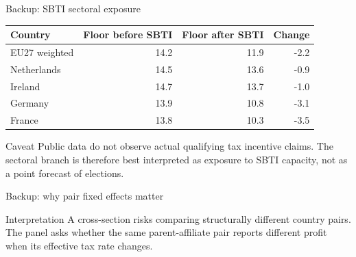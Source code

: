 \documentclass[aspectratio=169, 11pt]{beamer}
\begin{document}
\begin{frame}{Backup: SBTI sectoral exposure}
\begin{center}
\small
\begin{tabular}{@{}lrrr@{}}
  \toprule
  Country & Floor before SBTI & Floor after SBTI & Change \\
  \midrule
  EU27 weighted & 14.2 & 11.9 & -2.2 \\
  Netherlands & 14.5 & 13.6 & -0.9 \\
  Ireland & 14.7 & 13.7 & -1.0 \\
  Germany & 13.9 & 10.8 & -3.1 \\
  France & 13.8 & 10.3 & -3.5 \\
  \bottomrule
\end{tabular}
\end{center}

\vspace{0.6em}
\begin{block}{Caveat}
  Public data do not observe actual qualifying tax incentive claims. The sectoral branch is therefore best interpreted as exposure to SBTI capacity, not as a point forecast of elections.
\end{block}
\end{frame}

\begin{frame}{Backup: why pair fixed effects matter}
\begin{center}
\end{center}

\vspace{0.7em}
\begin{block}{Interpretation}
  A cross-section risks comparing structurally different country pairs. The panel asks whether the same parent-affiliate pair reports different profit when its effective tax rate changes.
\end{block}
\end{frame}
\end{document}
